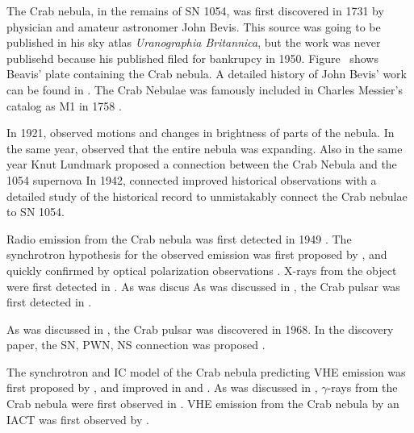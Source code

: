 The Crab nebula, in the remains of SN 1054,
was first discovered in 1731 by physician and amateur astronomer
John Bevis.  This source was going to be published in his sky atlas
{\em Uranographia Britannica}, but the work was never publisehd because
his published filed for bankrupcy in 1950.  Figure~
shows Beavis' plate containing the Crab nebula.  A detailed history of
John Bevis' work can be found in \cite{ashworth_1981_bevis-uranographia}.
The Crab Nebulae was famously included in Charles Messier's catalog as
M1 in 1758 \cite{hester_2008_nebula:-astrophysical}.

In 1921, \cite{lampland_1921a_observed-changes} 
observed motions and changes in brightness of parts of the nebula.
In the same year, \cite{duncan_1921a_changes-observed} observed
that the entire nebula was expanding. Also in the same year
Knut Lundmark proposed a connection between the Crab Nebula
and the 1054 supernova \citep{lundmark_1921a_suspected-stars}
In 1942, \cite{mayall_1942a_further-bearing} connected improved
historical observations with a detailed study of the historical record
to unmistakably connect the Crab nebulae to SN 1054.

Radio emission from the Crab nebula was first detected
in 1949 \citep{bolton_1949a_positions-three}.  The
synchrotron hypothesis for the observed emission was
first proposed by \cite{shklovskii_1953a_nature-nebulas},
and quickly confirmed by optical polarization observations
\citep{dombrovsky_1954a_nature-radiation}.  X-rays from the object were
first detected in \cite{bowyer_1964a_lunar-occultation}.  As was discus
As was discussed in , the Crab pulsar
was first detected in \cite{browning_1971_detection-pulsed}.

As was discussed in , the Crab pulsar
was discovered in 1968.  In the discovery paper, the \ac{SN}, \ac{PWN},
\ac{NS} connection was proposed \citep{staelin_1968_pulsating-radio}.

The synchrotron and \ac{IC} model of the Crab nebula predicting \ac{VHE}
emission was first proposed by \cite{gould_1965a_energy-cosmic},
and improved in \cite{rieke_1969a_production-cosmic} and
\cite{grindlay_1971a_compton-synchrotron-spectrum}.  As was discussed
in , $\gamma$-rays from the Crab
nebula were first observed in \cite{nolan_1993a_observations-pulsar}.
\ac{VHE} emission from the Crab nebula by an \ac{IACT} was first observed
by \cite{weekes_1989a_observation-gamma}.

